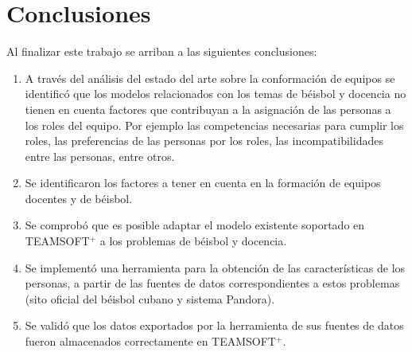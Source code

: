 \chapter*{Conclusiones}
Al finalizar este trabajo se arriban a las siguientes conclusiones:
\begin{enumerate}
	\item A través del análisis del estado del arte sobre la conformación de equipos se identificó que los modelos relacionados con los temas de béisbol y docencia no tienen en cuenta factores que contribuyan a la asignación de las personas a los roles del equipo. Por ejemplo las competencias necesarias para cumplir los roles, las preferencias de las personas por los roles, las incompatibilidades entre las personas, entre otros.
	\item Se identificaron los factores a tener en cuenta en la formación de equipos docentes y de béisbol.
	\item Se comprobó que es posible adaptar el modelo existente soportado en TEAMSOFT$^+$ a los problemas de béisbol y docencia.
	\item Se implementó una herramienta para la obtención de las características de los personas, a partir de las fuentes de datos correspondientes a estos problemas (sito oficial del béisbol cubano y sistema Pandora).
	\item Se validó que los datos exportados por la herramienta de sus fuentes de datos fueron almacenados correctamente en TEAMSOFT$^+$.
\end{enumerate}
